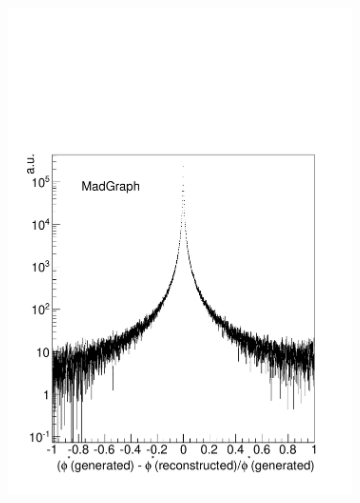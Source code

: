 \begin{figure}[!htbp]
    \centering
    \begin{subfigure}[b]{\SideBySidePlotWidth}
        \includegraphics[width=\textwidth]{figures/DPhistar_M.pdf}
        \caption{}
        \label{fig:phistar_resolution}
    \end{subfigure}%
    \begin{subfigure}[b]{\SideBySidePlotWidth}

\end{subfigure}
\end{figure}
